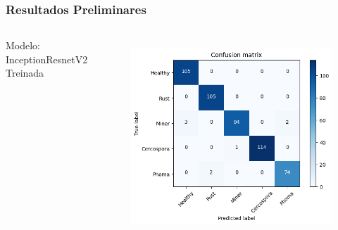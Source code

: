 \documentclass[aspectratio=169]{beamer}
\begin{document}
\begin{frame}
    \frametitle{Resultados Preliminares}

    \centering


    \begin{columns}



        \centering
        \tiny Modelo: InceptionResnetV2 Treinada
        \begin{figure}
            \centering
            \includegraphics[scale=0.39]{img/Inceptionresult1.png}
            \label{fig:enter-label}
        \end{figure}
        \centering




\end{columns}
\end{frame}
\end{document}
